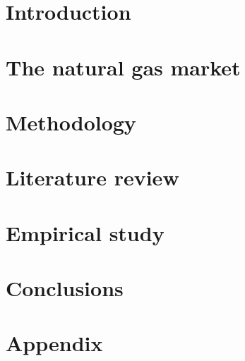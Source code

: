 
\part{Introduction}

%
\part{The natural gas market}


\part{Methodology}


\part{Literature review}


\part{Empirical study}




\part{Conclusions}





\part{Appendix}
\newpage


\newpage



